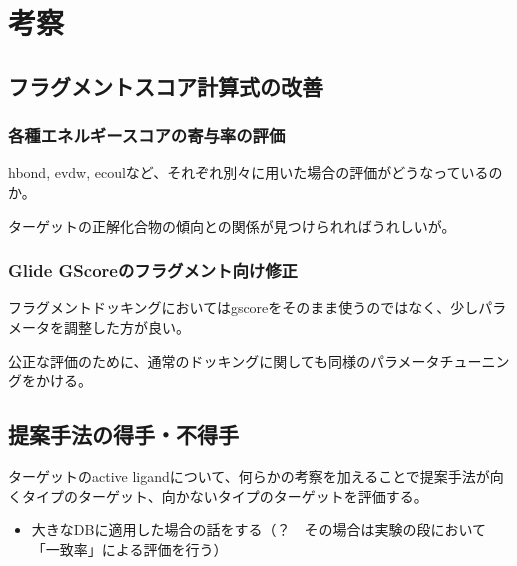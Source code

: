 \chapter{考察}

\section{フラグメントスコア計算式の改善}
\subsection{各種エネルギースコアの寄与率の評価}
hbond, evdw, ecoulなど、それぞれ別々に用いた場合の評価がどうなっているのか。

ターゲットの正解化合物の傾向との関係が見つけられればうれしいが。
\subsection{Glide GScoreのフラグメント向け修正}
フラグメントドッキングにおいてはgscoreをそのまま使うのではなく、少しパラメータを調整した方が良い。

公正な評価のために、通常のドッキングに関しても同様のパラメータチューニングをかける。

\section{提案手法の得手・不得手}
ターゲットのactive ligandについて、何らかの考察を加えることで提案手法が向くタイプのターゲット、向かないタイプのターゲットを評価する。

\begin{itemize}
\item 大きなDBに適用した場合の話をする（？　その場合は実験の段において「一致率」による評価を行う）
\end{itemize}
